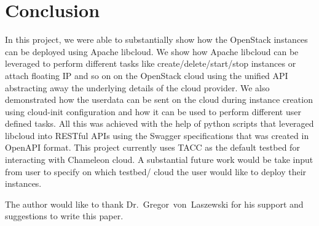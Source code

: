 \section{Conclusion}
In this project, we were able to substantially show how the OpenStack instances
can be deployed using Apache libcloud. We show how Apache libcloud can be
leveraged to perform different tasks like create/delete/start/stop instances or
attach floating IP and so on on the OpenStack cloud using the unified API
abstracting away the underlying details of the cloud provider. We also
demonstrated how the userdata can be sent on the cloud during instance creation
using cloud-init configuration and how it can be used to perform different user
defined tasks. All this was achieved with the help of python scripts that
leveraged libcloud into RESTful APIs using the Swagger specifications that was
created in OpenAPI format. This project currently uses TACC as the default
testbed for interacting with Chameleon cloud. A substantial future work would 
be take input from user to specify on which testbed/ cloud the user would like 
to deploy their instances. 

\begin{acks}

  The author would like to thank Dr.~Gregor~von~Laszewski for his
  support and suggestions to write this paper.

\end{acks}


 

